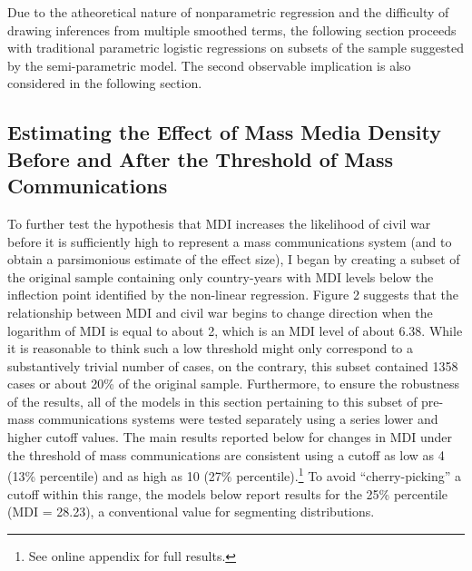 \documentclass[11pt,article,oneside]{memoir}
\begin{document}
Due to the atheoretical nature of nonparametric regression and the
difficulty of drawing inferences from multiple smoothed terms, the
following section proceeds with traditional parametric logistic
regressions on subsets of the sample suggested by the semi-parametric
model. The second observable implication is also considered in the
following section.

\subsection{Estimating the Effect of Mass Media Density Before and After
the Threshold of Mass
Communications}\label{estimating-the-effect-of-mass-media-density-before-and-after-the-threshold-of-mass-communications}

To further test the hypothesis that MDI increases the likelihood of
civil war before it is sufficiently high to represent a mass
communications system (and to obtain a parsimonious estimate of the
effect size), I began by creating a subset of the original sample
containing only country-years with MDI levels below the inflection point
identified by the non-linear regression. Figure 2 suggests that the
relationship between MDI and civil war begins to change direction when
the logarithm of MDI is equal to about 2, which is an MDI level of about
6.38. While it is reasonable to think such a low threshold might only
correspond to a substantively trivial number of cases, on the contrary,
this subset contained 1358 cases or about 20\% of the original sample.
Furthermore, to ensure the robustness of the results, all of the models
in this section pertaining to this subset of pre-mass communications
systems were tested separately using a series lower and higher cutoff
values. The main results reported below for changes in MDI under the
threshold of mass communications are consistent using a cutoff as low as
4 (13\% percentile) and as high as 10 (27\% percentile).\footnote{See
  online appendix for full results.} To avoid ``cherry-picking'' a
cutoff within this range, the models below report results for the 25\%
percentile (MDI = 28.23), a conventional value for segmenting
distributions.
\end{document}
